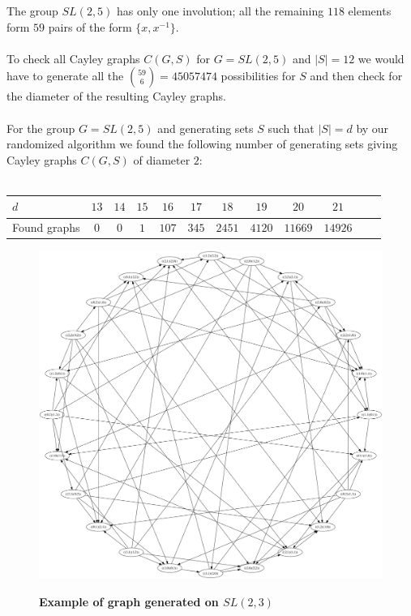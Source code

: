 \documentclass[portrait,a0,final]{a0poster}
\begin{document}
\begin{multicols}{3}
The group $SL(2,5)$ has only one involution; all the remaining $118$ elements form $59$ pairs of the form $\{x,x^{-1}\}$. \\~\\
To check all Cayley graphs $C(G,S)$ for $G=SL(2,5)$ and $|S|=12$ we would have to generate all the ${59 \choose 6} = 45057474$ possibilities for $S$ and then check for the diameter of the resulting Cayley graphs. \\~\\
For the group $G=SL(2,5)$ and generating sets $S$ such that $|S|=d$ by our randomized algorithm we found the following number of generating sets giving Cayley graphs $C(G,S)$ of diameter $2$: \\~\\

\begin{tabular}[htbp]{l*{10}{c}r}
		$d$ & $13$ & $14$ & $15$ & $16$ & $17$ & $18$ & $19$ & $20$ & $21$ \\ 
		\hline
		Found graphs & $0$ & $0$ & $1$ & $107$ & $345$ & $2451$ & $4120$ & $11669$ & $14926$ \\
\end{tabular}

\begin{figure}
	\centering
	\includegraphics[scale=0.40]{example.png} 

	\textbf{Example of graph generated on $SL(2,3)$}
\end{figure}
~\\~\\~\\~\\

\end{multicols}
\end{document}
